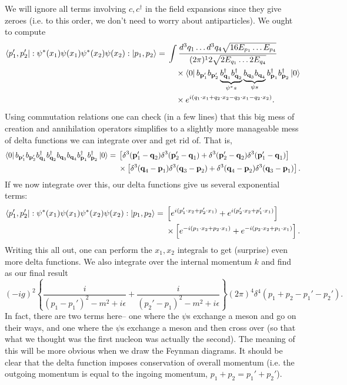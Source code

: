 We will ignore all terms involving $c,c^\dagger$ in the field expansions since they give zeroes (i.e. to this order, we don't need to worry about antiparticles). We ought to compute
\begin{align*}
    \left< p_1',p_2' \right|:\psi^*(x_1)\psi(x_1)\psi^*(x_2)\psi(x_2):\left| p_1,p_2 \right>={}&\int \frac{d^3 q_1 \ldots d^3 q_4 \sqrt{16 E_{p_1}\ldots E_{p_4}}}{(2\pi)^12 \sqrt{2E_{q_1}\ldots 2E_{q_4}}}\\ 
    &\quad {}\times\left< 0 \right|b_{\boldsymbol{\mathbf{p}}_1'} b_{\boldsymbol{\mathbf{p}}_2'} \underbrace{b_{\boldsymbol{\mathbf{q}}_1}^\dagger b_{\boldsymbol{\mathbf{q}}_2}^\dagger}_{\psi^*s} \underbrace{b_{\boldsymbol{\mathbf{q}}_3} b_{\boldsymbol{\mathbf{q}}_4}}_{\psi s} b_{\boldsymbol{\mathbf{p}}_1}^\dagger b_{\boldsymbol{\mathbf{p}}_2}^\dagger \left| 0 \right>\\
    &\quad {}\times e^{i(q_1\cdot x_1 +q_2 \cdot x_2-q_3 \cdot x_1 -q_2 \cdot x_2)}.
\end{align*}
Using commutation relations one can check (in a few lines) that this big mess of creation and annihilation operators simplifies to a slightly more manageable mess of delta functions we can integrate over and get rid of. That is,
\begin{align*}
    \left< 0 \right|b_{\boldsymbol{\mathbf{p}}_1'} b_{\boldsymbol{\mathbf{p}}_2'} {b_{\boldsymbol{\mathbf{q}}_1}^\dagger b_{\boldsymbol{\mathbf{q}}_2}^\dagger} {b_{\boldsymbol{\mathbf{q}}_3} b_{\boldsymbol{\mathbf{q}}_4}} b_{\boldsymbol{\mathbf{p}}_1}^\dagger b_{\boldsymbol{\mathbf{p}}_2}^\dagger \left| 0 \right>={}&
        \left[ \delta^3(\boldsymbol{\mathbf{p}}_1'-\boldsymbol{\mathbf{q}}_2)\delta^3(\boldsymbol{\mathbf{p}}_2'-\boldsymbol{\mathbf{q}}_1)+\delta^3(\boldsymbol{\mathbf{p}}_2'-\boldsymbol{\mathbf{q}}_2)\delta^3 (\boldsymbol{\mathbf{p}}_1' - \boldsymbol{\mathbf{q}}_1)\right]\\
    &\times \left[\delta^3 (\boldsymbol{\mathbf{q}}_4-\boldsymbol{\mathbf{p}}_1)\delta^3 (\boldsymbol{\mathbf{q}}_3-\boldsymbol{\mathbf{p}}_2)+\delta^3(\boldsymbol{\mathbf{q}}_4-\boldsymbol{\mathbf{p}}_2)\delta^3(\boldsymbol{\mathbf{q}}_3 - \boldsymbol{\mathbf{p}}_1)\right].
\end{align*}
If we now integrate over this, our delta functions give us several exponential terms:
\begin{align*}
    \left< p_1', p_2' \right|:\psi^*(x_1)\psi(x_1)\psi^*(x_2)\psi(x_2):\left| p_1,p_2 \right>={}&\left[e^{i(p_1'\cdot x_2 +p_2' \cdot x_1)}+e^{i(p_2'\cdot x_2 + p_1'\cdot x_1)}\right]\\
    &\times\left[e^{-i(p_1\cdot x_2 +p_2 \cdot x_1)}+e^{-i(p_2\cdot x_2 + p_1\cdot x_1)}\right].
\end{align*}
Writing this all out, one can perform the $x_1,x_2$ integrals to get (surprise) even more delta functions. We also integrate over the internal momentum $k$ and find as our final result
$$(-ig)^2 \left\{\frac{i}{(p_1-p_1')^2-m^2+i\epsilon}+\frac{i}{(p_2'-p_1)^2-m^2+i\epsilon}\right\} (2\pi)^4\delta^4(p_1+p_2-p_1'-p_2').$$
In fact, there are two terms here-- one where the $\psi$s exchange a meson and go on their ways, and one where the $\psi$s exchange a meson and then cross over (so that what we thought was the first nucleon was actually the second). The meaning of this will be more obvious when we draw the Feynman diagrams. It should be clear that the delta function imposes conservation of overall momentum (i.e. the outgoing momentum is equal to the ingoing momentum, $p_1+p_2=p_1'+p_2'$).

